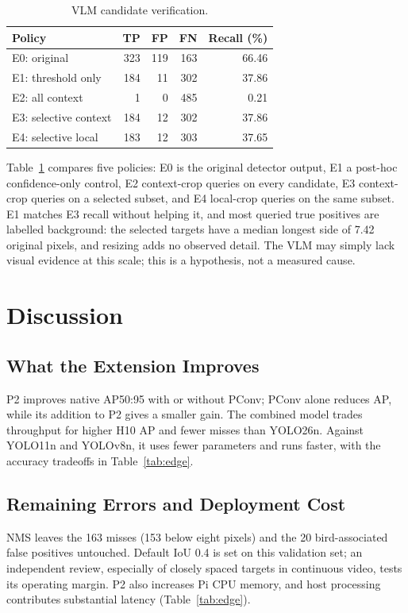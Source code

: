 \documentclass[lettersize,journal]{IEEEtran}
\begin{document}
\begin{table}[t]
\caption{VLM candidate verification.}
\label{tab:vlm}
\centering\small
\begin{tabular}{lrrrr}
\hline
Policy & TP & FP & FN & Recall (\%)\\
\hline
E0: original & 323 & 119 & 163 & 66.46\\
E1: threshold only & 184 & 11 & 302 & 37.86\\
E2: all context & 1 & 0 & 485 & 0.21\\
E3: selective context & 184 & 12 & 302 & 37.86\\
E4: selective local & 183 & 12 & 303 & 37.65\\
\hline
\end{tabular}
\end{table}

Table~\ref{tab:vlm} compares five policies: E0 is the original detector output, E1 a post-hoc confidence-only control, E2 context-crop queries on every candidate, E3 context-crop queries on a selected subset, and E4 local-crop queries on the same subset. E1 matches E3 recall without helping it, and most queried true positives are labelled background: the selected targets have a median longest side of 7.42 original pixels, and resizing adds no observed detail. The VLM may simply lack visual evidence at this scale; this is a hypothesis, not a measured cause.

\section{Discussion}
\subsection{What the Extension Improves}
P2 improves native AP50:95 with or without PConv; PConv alone reduces AP, while its addition to P2 gives a smaller gain. The combined model trades throughput for higher H10 AP and fewer misses than YOLO26n. Against YOLO11n and YOLOv8n, it uses fewer parameters and runs faster, with the accuracy tradeoffs in Table~\ref{tab:edge}.

\subsection{Remaining Errors and Deployment Cost}
NMS leaves the 163 misses (153 below eight pixels) and the 20 bird-associated false positives untouched. Default IoU 0.4 is set on this validation set; an independent review, especially of closely spaced targets in continuous video, tests its operating margin. P2 also increases Pi CPU memory, and host processing contributes substantial latency (Table~\ref{tab:edge}).
\end{document}
